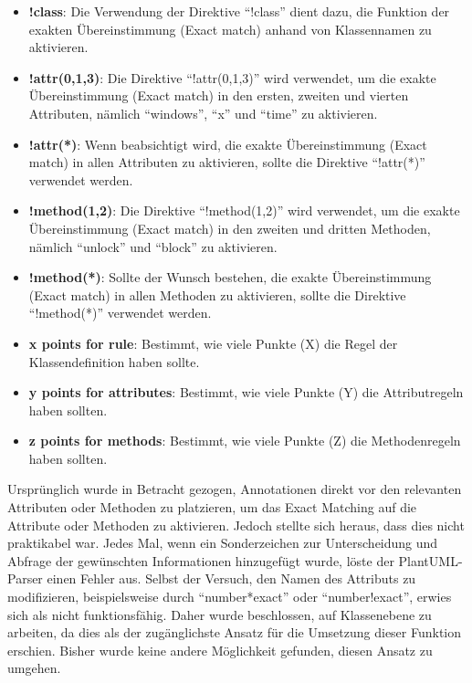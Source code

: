 \begin{itemize}[label={}]
    \item \textbf{!class}: Die Verwendung der Direktive ``!class'' dient dazu, die Funktion der exakten Übereinstimmung
    (Exact match) anhand von Klassennamen zu aktivieren.
    \item \textbf{!attr(0,1,3)}: Die Direktive ``!attr(0,1,3)'' wird verwendet, um die exakte Übereinstimmung (Exact match) in den
    ersten, zweiten und vierten Attributen, nämlich ``windows'', ``x'' und ``time'' zu aktivieren.
    \item \textbf{!attr(*)}: Wenn beabsichtigt wird, die exakte Übereinstimmung (Exact match) in allen Attributen zu aktivieren,
sollte die Direktive ``!attr(*)'' verwendet werden.
    \item \textbf{!method(1,2)}: Die Direktive ``!method(1,2)'' wird verwendet, um die exakte Übereinstimmung (Exact match) in den
zweiten und dritten Methoden, nämlich ``unlock'' und ``block'' zu aktivieren.
    \item \textbf{!method(*)}: Sollte der Wunsch bestehen, die exakte Übereinstimmung (Exact match) in allen Methoden zu
aktivieren, sollte die Direktive ``!method(*)'' verwendet werden.
    \item \textbf{x points for rule}: Bestimmt, wie viele Punkte (X) die Regel der Klassendefinition haben sollte.
    \item \textbf{y points for attributes}:  Bestimmt, wie viele Punkte (Y) die Attributregeln haben sollten.
    \item \textbf{z points for methods}: Bestimmt, wie viele Punkte (Z) die Methodenregeln haben sollten.
\end{itemize}


Ursprünglich wurde in Betracht gezogen, Annotationen direkt vor den relevanten Attributen oder Methoden zu platzieren,
um das Exact Matching auf die Attribute oder Methoden zu aktivieren. Jedoch stellte sich heraus, dass dies nicht
praktikabel war. Jedes Mal, wenn ein Sonderzeichen zur Unterscheidung und Abfrage der gewünschten Informationen
hinzugefügt wurde, löste der PlantUML-Parser einen Fehler aus. Selbst der Versuch, den Namen des Attributs zu
modifizieren, beispielsweise durch ``number*exact'' oder ``number!exact'', erwies sich als nicht funktionsfähig.
Daher wurde beschlossen, auf Klassenebene zu arbeiten, da dies als der zugänglichste Ansatz für die Umsetzung dieser
Funktion erschien. Bisher wurde keine andere Möglichkeit gefunden, diesen Ansatz zu umgehen.

